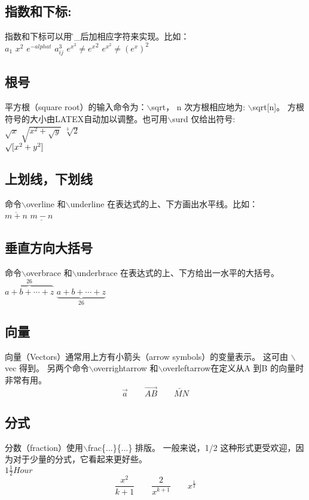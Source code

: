 \documentclass{ctexart}
\begin{document}
\subsection{指数和下标:}
指数和下标可以用\^和\_后加相应字符来实现。比如：\\
$a_{1}$ \qquad
$x^{2}$ \qquad
$e^{-alpha t}$ \qquad
$a^{3}_{ij}$  \qquad
$e^{x^2} \neq {e^x}^2$ \qquad
$e^{x^2} \neq (e^x)^2$

\subsection{根号}
平方根（square root）的输入命令为：$\backslash$sqrt，
n 次方根相应地为: $\backslash$sqrt[n]。
方根符号的大小由LATEX自动加以调整。也可用$\backslash$surd 仅给出符号: \\
$\sqrt{x}$ \qquad
$\sqrt{x^{2}+\sqrt{y} }$ \qquad
$\sqrt[3]{2}$   \qquad
\\[3pt]$\surd[x^2 + y^2]$ 

\subsection{上划线，下划线}
命令$\backslash$overline 和$\backslash$underline 在表达式的上、下方画出水平线。比如： \\
$\overline{m+n}$ \qquad
$\underline{m-n}$

\subsection{垂直方向大括号}
命令$\backslash$overbrace 和$\backslash$underbrace 在表达式的上、下方给出一水平的大括号。\\
$\overbrace{ a+b+\cdots+z }^{26}$ \qquad
$\underbrace{ a+b+\cdots+z }_{26}$

\subsection{向量}
向量（Vectors）通常用上方有小箭头（arrow symbols）的变量表示。
这可由 $\backslash$vec 得到。
另两个命令$\backslash$overrightarrow 和$\backslash$overleftarrow在定义从A 到B 的向量时非常有用。\\
\begin{displaymath}
\vec a \qquad
\overrightarrow{AB} \qquad
\overleftarrow{MN}
\end{displaymath}

\subsection{分式}
分数（fraction）使用$\backslash$frac\{...\}\{...\} 排版。
一般来说，1/2 这种形式更受欢迎，因为对于少量的分式，它看起来更好些。\\
$1\frac{1}{2}Hour$ \qquad
\begin{displaymath}
  \frac{x^2}{k+1} \qquad
  \frac{2}{x^{k+1}} \qquad
  x^{\frac{1}{2}}
\end{displaymath}
\end{document}
